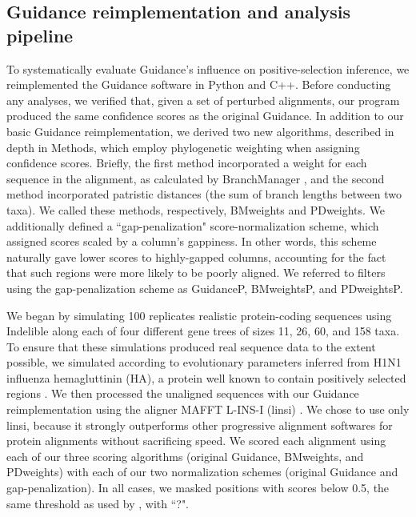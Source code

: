 \documentclass[10pt]{article}
\begin{document}
\subsection*{Guidance reimplementation and analysis pipeline}
To systematically evaluate Guidance's influence on positive-selection inference, we reimplemented the Guidance software in Python and C++. Before conducting any analyses, we verified that, given a set of perturbed alignments, our program produced the same confidence scores as the original Guidance. In addition to our basic Guidance reimplementation, we derived two new algorithms, described in depth in Methods, which employ phylogenetic weighting when assigning confidence scores. Briefly, the first method incorporated a weight for each sequence in the alignment, as calculated by BranchManager \citep{Stone2007}, and the second method incorporated patristic distances (the sum of branch lengths between two taxa). We called these methods, respectively, BMweights and PDweights.  We additionally defined a ``gap-penalization" score-normalization scheme, which assigned scores scaled by a column's gappiness. In other words, this scheme naturally gave lower scores to highly-gapped columns, accounting for the fact that such regions were more likely to be poorly aligned. We referred to filters using the gap-penalization scheme as GuidanceP, BMweightsP, and PDweightsP.

We began by simulating 100 replicates realistic protein-coding sequences using Indelible \citep{Fletcher2009} along each of four different gene trees of sizes 11, 26, 60, and 158 taxa. To ensure that these simulations produced real sequence data to the extent possible, we simulated according to evolutionary parameters inferred from H1N1 influenza hemagluttinin (HA), a protein well known to contain positively selected regions \citep{Bush1999, Kryazhimskiy2008, Meyer2012}. We then processed the unaligned sequences with our Guidance reimplementation using the aligner MAFFT L-INS-I (linsi) \citep{Katoh2005}. We chose to use only linsi, because it strongly outperforms other progressive alignment softwares for protein alignments \citep{Nuin2006,Thompson2011} without sacrificing speed. We scored each alignment using each of our three scoring algorithms (original Guidance, BMweights, and PDweights) with each of our two normalization schemes (original Guidance and gap-penalization). In all cases, we masked positions with scores below 0.5, the same threshold as used by \citet{Jordan2012}, with ``?". 
\end{document}
